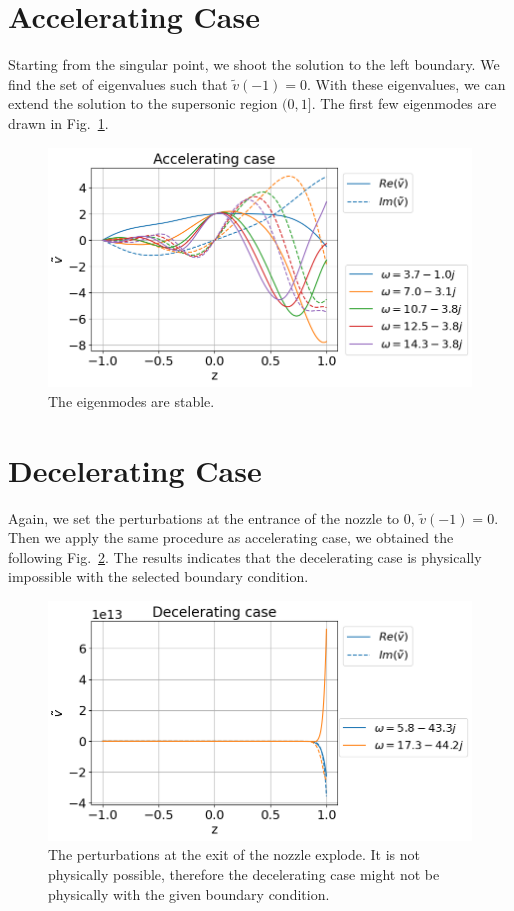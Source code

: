 \section{Accelerating Case}
Starting from the singular point, we shoot the solution to the left boundary. We find the set of eigenvalues such that $\tilde{v}(-1)=0$. With these eigenvalues, we can extend the solution to the supersonic region $(0,1]$. The first few eigenmodes are drawn in Fig.~\ref{fig:results-accelerating-v}.
\begin{figure} [H]
	\centering
	\includegraphics[width=0.7\linewidth]{figures/results-accelerating-v}
	\caption{The eigenmodes are stable.}
	\label{fig:results-accelerating-v}
\end{figure}

\section{Decelerating Case}
Again, we set the perturbations at the entrance of the nozzle to 0, $\tilde{v}(-1)=0$. Then we apply the same procedure as accelerating case, we obtained the following Fig.~\ref{fig:results-decelerating-v}. The results indicates that the decelerating case is physically impossible with the selected boundary condition.
\begin{figure} [H]
	\centering
	\includegraphics[width=0.7\linewidth]{figures/results-decelerating-v}
	\caption{The perturbations at the exit of the nozzle explode. It is not physically possible, therefore the decelerating case might not be physically with the given boundary condition.}
	\label{fig:results-decelerating-v}
\end{figure}
